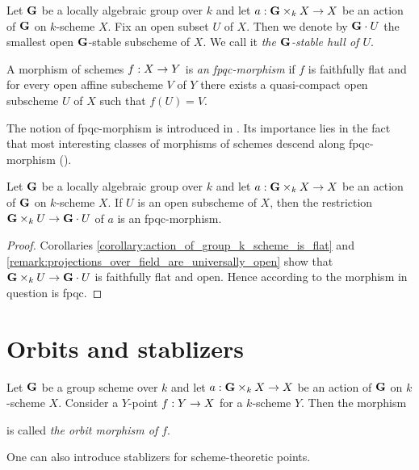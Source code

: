 \begin{definition}
Let $\mathbf{G}$ be a locally algebraic group over $k$ and let $a:\mathbf{G}\times_k X\rightarrow X$ be an action of $\mathbf{G}$ on $k$-scheme $X$. Fix an open subset $U$ of $X$. Then we denote by $\mathbf{G}\cdot U$ the smallest open $\mathbf{G}$-stable subscheme of $X$. We call it \textit{the $\mathbf{G}$-stable hull of $U$}.
\end{definition}

\begin{definition}
A morphism of schemes $f:X\rightarrow Y$ is \textit{an fpqc-morphism} if $f$ is faithfully flat and for every open affine subscheme $V$ of $Y$ there exists a quasi-compact open subscheme $U$ of $X$ such that $f(U) = V$.
\end{definition}
\noindent
The notion of fpqc-morphism is introduced in {\cite[Definition 2.34]{fantechi2005fundamental}}. Its importance lies in the fact that most interesting classes of morphisms of schemes descend along fpqc-morphism ({\cite[Proposition 2.36]{fantechi2005fundamental}}).

\begin{corollary}\label{corollary:restriction_of_actions_of_algebraic_groups_are_fpqc}
Let $\mathbf{G}$ be a locally algebraic group over $k$ and let $a:\mathbf{G}\times_k X\rightarrow X$ be an action of $\mathbf{G}$ on $k$-scheme $X$. If $U$ is an open subscheme of $X$, then the restriction $\mathbf{G}\times_k U \rightarrow \mathbf{G}\cdot U$ of $a$ is an fpqc-morphism.
\end{corollary}
\begin{proof}
Corollaries \ref{corollary:action_of_group_k_scheme_is_flat} and \ref{remark:projections_over_field_are_universally_open} show that $\mathbf{G}\times_k U \rightarrow \mathbf{G}\cdot U$ is faithfully flat and open. Hence according to {\cite[\textit(iii) of Proposition 2.35]{fantechi2005fundamental}} the morphism in question is fpqc.
\end{proof}

\section{Orbits and stablizers}

\begin{definition}
Let $\mathbf{G}$ be a group scheme over $k$ and let $a:\mathbf{G}\times_k X\rightarrow X$ be an action of $\mathbf{G}$ on $k$-scheme $X$. Consider a $Y$-point $f:Y\rightarrow X$ for a $k$-scheme $Y$. Then the morphism
\begin{center}
\end{center}
is called \textit{the orbit morphism of $f$}.
\end{definition}
\noindent
One can also introduce stablizers for scheme-theoretic points.

